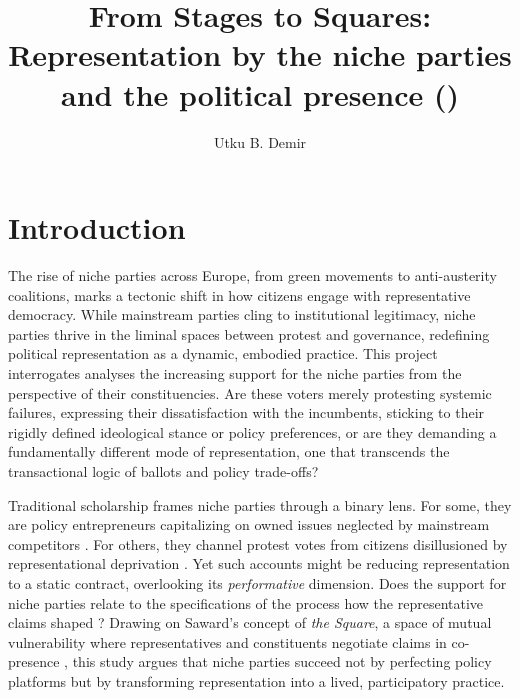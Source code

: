 
\usepackage{syntonly}

\title{From Stages to Squares: Representation by the niche parties and the
political presence ()}
\author{Utku B. Demir}

\maketitle

\chapter{Introduction}\label{chap:Introduction} %

The rise of niche parties across Europe, from green movements to anti-austerity coalitions, marks a tectonic shift in how citizens engage with representative democracy. While mainstream parties cling to institutional legitimacy, niche parties thrive in the liminal spaces between protest and governance, redefining political representation as a dynamic, embodied practice. This project interrogates analyses the increasing support for the niche parties from the perspective of their constituencies. Are these voters merely protesting systemic failures, expressing their dissatisfaction with the incumbents, sticking to their rigidly defined ideological stance or policy preferences, or are they demanding a fundamentally different mode of representation, one that transcends the transactional logic of ballots and policy trade-offs?

Traditional scholarship frames niche parties through a binary lens. For some, they are policy entrepreneurs capitalizing on owned issues neglected by mainstream competitors \parencite{meguid2005}. For others, they channel protest votes from citizens disillusioned by representational deprivation \parencite{nonnemacher2023}. Yet such accounts might be reducing representation to a static contract, overlooking its \textit{performative} dimension. Does the support for niche parties relate to the specifications of the process how the representative claims shaped \parencite{saward2010}? Drawing on Saward’s concept of \textit{the Square}, a space of mutual vulnerability where representatives and constituents negotiate claims in co-presence \parencite[5]{saward2024}, this study argues that niche parties succeed not by perfecting policy platforms but by transforming representation into a lived, participatory practice.


